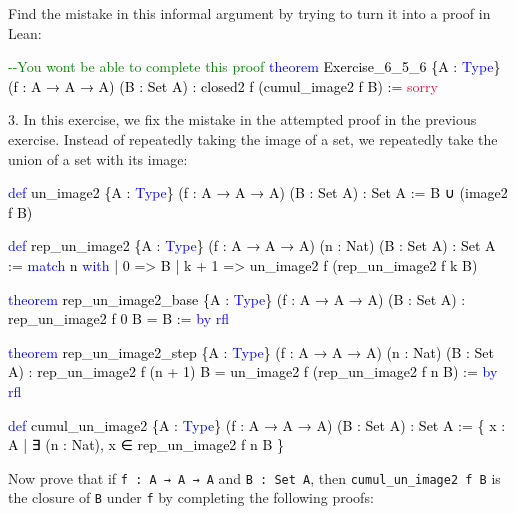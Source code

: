 \documentclass[
  letterpaper,
  DIV=11,
  numbers=noendperiod]{scrreprt}
\newenvironment{Shaded}{\begin{snugshade}}{\end{snugshade}}
\newcommand{\CommentTok}[1]{\textcolor[rgb]{0.37,0.37,0.37}{#1}}
\newcommand{\ConstantTok}[1]{\textcolor[rgb]{0.56,0.35,0.01}{#1}}
\newcommand{\KeywordTok}[1]{\textcolor[rgb]{0.00,0.23,0.31}{#1}}
\newcommand{\NormalTok}[1]{\textcolor[rgb]{0.00,0.23,0.31}{#1}}
\renewcommand{\NormalTok}[1]{\textcolor[HTML]{000000}{#1}}
\renewcommand{\KeywordTok}[1]{\textcolor[HTML]{0000FF}{#1}}
\renewcommand{\CommentTok}[1]{\textcolor[HTML]{008000}{#1}}
\renewcommand{\ConstantTok}[1]{\textcolor[HTML]{DC143C}{#1}}
\theoremstyle{remark}
\begin{document}
Find the mistake in this informal argument by trying to turn it into a
proof in Lean:

\begin{Shaded}
\begin{Highlighting}[]
\CommentTok{{-}{-}You won\textquotesingle{}t be able to complete this proof}
\KeywordTok{theorem}\NormalTok{ Exercise\_6\_5\_6 \{A : }\KeywordTok{Type}\NormalTok{\} (f : A → A → A) (B : Set A) :}
\NormalTok{    closed2 f (cumul\_image2 f B) := }\ConstantTok{sorry}
\end{Highlighting}
\end{Shaded}

3. In this exercise, we fix the mistake in the attempted proof in the
previous exercise. Instead of repeatedly taking the image of a set, we
repeatedly take the union of a set with its image:

\begin{Shaded}
\begin{Highlighting}[]
\KeywordTok{def}\NormalTok{ un\_image2 \{A : }\KeywordTok{Type}\NormalTok{\} (f : A → A → A) (B : Set A) : Set A :=}
\NormalTok{  B ∪ (image2 f B)}

\KeywordTok{def}\NormalTok{ rep\_un\_image2 \{A : }\KeywordTok{Type}\NormalTok{\}}
\NormalTok{    (f : A → A → A) (n : Nat) (B : Set A) : Set A :=}
  \KeywordTok{match}\NormalTok{ n }\KeywordTok{with}
\NormalTok{    | 0 =\textgreater{} B}
\NormalTok{    | k + 1 =\textgreater{} un\_image2 f (rep\_un\_image2 f k B)}

\KeywordTok{theorem}\NormalTok{ rep\_un\_image2\_base \{A : }\KeywordTok{Type}\NormalTok{\} (f : A → A → A) (B : Set A) :}
\NormalTok{    rep\_un\_image2 f 0 B = B := }\KeywordTok{by} \KeywordTok{rfl}

\KeywordTok{theorem}\NormalTok{ rep\_un\_image2\_step \{A : }\KeywordTok{Type}\NormalTok{\}}
\NormalTok{    (f : A → A → A) (n : Nat) (B : Set A) :}
\NormalTok{    rep\_un\_image2 f (n + 1) B =}
\NormalTok{    un\_image2 f (rep\_un\_image2 f n B) := }\KeywordTok{by} \KeywordTok{rfl}

\KeywordTok{def}\NormalTok{ cumul\_un\_image2 \{A : }\KeywordTok{Type}\NormalTok{\}}
\NormalTok{    (f : A → A → A) (B : Set A) : Set A :=}
\NormalTok{  \{ x : A | ∃ (n : Nat), x ∈ rep\_un\_image2 f n B \}}
\end{Highlighting}
\end{Shaded}

Now prove that if \texttt{f\ :\ A\ →\ A\ →\ A} and
\texttt{B\ :\ Set\ A}, then \texttt{cumul\_un\_image2\ f\ B} is the
closure of \texttt{B} under \texttt{f} by completing the following
proofs:
\end{document}
